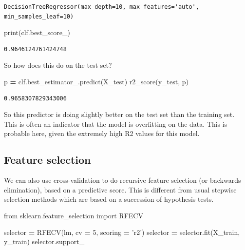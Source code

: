 \documentclass[
  letterpaper,
]{scrbook}
\newenvironment{Shaded}{\begin{snugshade}}{\end{snugshade}}
\newcommand{\BuiltInTok}[1]{#1}
\newcommand{\DecValTok}[1]{\textcolor[rgb]{0.00,0.00,0.81}{#1}}
\newcommand{\ImportTok}[1]{#1}
\newcommand{\NormalTok}[1]{#1}
\newcommand{\OperatorTok}[1]{\textcolor[rgb]{0.81,0.36,0.00}{\textbf{#1}}}
\newcommand{\StringTok}[1]{\textcolor[rgb]{0.31,0.60,0.02}{#1}}
\begin{document}
\begin{verbatim}
DecisionTreeRegressor(max_depth=10, max_features='auto', min_samples_leaf=10)
\end{verbatim}

\begin{Shaded}
\begin{Highlighting}[]
\BuiltInTok{print}\NormalTok{(clf.best_score_)}
\end{Highlighting}
\end{Shaded}

\begin{verbatim}
0.9646124761424748
\end{verbatim}

So how does this do on the test set?

\begin{Shaded}
\begin{Highlighting}[]
\NormalTok{p }\OperatorTok{=}\NormalTok{ clf.best_estimator_.predict(X_test)}
\NormalTok{r2_score(y_test, p)}
\end{Highlighting}
\end{Shaded}

\begin{verbatim}
0.9658307829343006
\end{verbatim}

So this predictor is doing slightly better on the test set than the training set. This is often an indicator that the model is overfitting on the data. This is probable here, given the extremely high R2 values for this model.

\hypertarget{feature-selection}{%
\subsection{Feature selection}\label{feature-selection}}

We can also use cross-validation to do recursive feature selection (or
backwards elimination), based on a predictive score. This is different
from usual stepwise selection methods which are based on a succession of
hypothesis tests.

\begin{Shaded}
\begin{Highlighting}[]
\ImportTok{from}\NormalTok{ sklearn.feature_selection }\ImportTok{import}\NormalTok{ RFECV}

\NormalTok{selector }\OperatorTok{=}\NormalTok{ RFECV(lm, cv }\OperatorTok{=} \DecValTok{5}\NormalTok{, scoring }\OperatorTok{=} \StringTok{'r2'}\NormalTok{)}
\NormalTok{selector }\OperatorTok{=}\NormalTok{ selector.fit(X_train, y_train)}
\NormalTok{selector.support_}
\end{Highlighting}
\end{Shaded}
\end{document}
